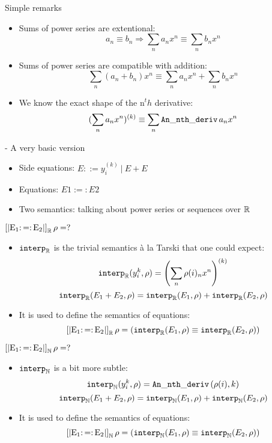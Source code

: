 \documentclass{beamer}
\begin{document}
\begin{frame}{Simple remarks}
\begin{itemize}
  \item Sums of power series are extentional:
    $$a_n \equiv b_n \Rightarrow
   \sum_n a_n x^ n \equiv \sum_n b_n x ^ n$$
  \item Sums of power series are compatible with addition:
    $$\sum_n (a_n + b_n) x^ n \equiv \sum_n a_n x ^ n + \sum_n b_n x ^ n$$
  \item We know the exact shape of the n$^th$ derivative:
    $$(\sum_n a_n x^ n)^{(k)} \equiv \sum_n \Dn a_n x ^ n$$
\end{itemize}
\end{frame}

\begin{frame}{\solve{} - A very basic version}
\begin{itemize}
 \item Side equations: $E ::= y_i^{(k)} ~|~ E + E$
 \item<2-> Equations: $E1 :=: E2$
 \item<3-> Two semantics: talking about power series or sequences over $\R$
\end{itemize}
\end{frame}

\begin{frame}{$\SemR = ?$}
\begin{itemize}
\item $\IR$ is the trivial semantics à la Tarski that one could expect:
$$\IR (y^{k}_i, \rho) = \left(\sum_n \rho(i)_n x ^ n\right)^{(k)}$$
$$\IR (E_1 + E_2, \rho) = \IR(E_1, \rho) + \IR(E_2, \rho)$$

\bigskip

\item<2-> It is used to define the semantics of equations:
$$\SemR = (\IR(E_1, \rho) \equiv \IR(E_2, \rho))$$
\end{itemize}
\end{frame}

\begin{frame}{$\SemN = ?$}
\begin{itemize}
\item $\IN$ is a bit more subtle:
$$\IN (y^{k}_i, \rho) = \Dn{}(\rho(i), k)$$
$$\IN (E_1 + E_2, \rho) = \IN(E_1, \rho) + \IN(E_2, \rho)$$

\bigskip

\item<2-> It is used to define the semantics of equations:
$$\SemN = (\IN(E_1, \rho) \equiv \IN(E_2, \rho))$$
\end{itemize}
\end{frame}
\end{document}
